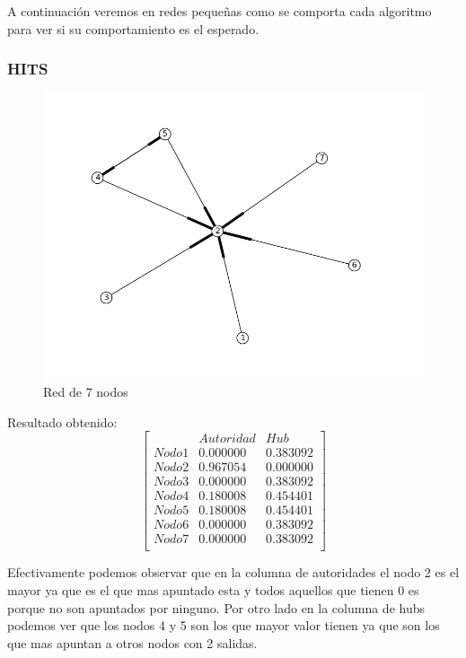 A continuación veremos en redes pequeñas como se comporta cada algoritmo para ver si su comportamiento es el esperado.

\subsubsection{HITS}
 \begin{figure}[!htb]
\begin{center}
    \includegraphics[scale=0.5]{imagenes/test4.png}
    \caption{Red de 7 nodos}
    \end{center}
\end{figure}

Resultado obtenido:
   $$ 
\begin{bmatrix}
              &    Autoridad  &  Hub \\
 Nodo 1 &   0.000000    &      0.383092       \\
 Nodo 2   &  0.967054    &  0.000000     \\
 Nodo 3   &  0.000000   &     0.383092  \\
 Nodo 4   &  0.180008    &     0.454401       \\
 Nodo 5   &  0.180008    &     0.454401        \\
 Nodo 6   &  0.000000    &      0.383092     \\
 Nodo 7   &  0.000000   &     0.383092 \\
\end{bmatrix} 
$$

Efectivamente podemos observar que en la columna de autoridades el nodo 2 es el mayor ya que es el que mas apuntado esta y todos aquellos que tienen 0 es porque no son apuntados por ninguno. Por otro lado en la columna de hubs podemos ver que los nodos 4 y 5 son los que mayor valor tienen ya que son los que mas apuntan a otros nodos con 2 salidas.

